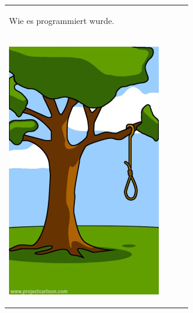 \begin{tabularx}{\textwidth}{XXXX}
\begin{minipage}[t]{0.23\textwidth}
\begin{center}
Wie es programmiert wurde.
\end{center}
\end{minipage}
\\
\begin{minipage}[t]{0.23\textwidth}
\begin{center}
\includegraphics[width=1.0\textwidth]{./inf/SEKII/29_Softwaretechnik/PM_05.jpg}


\end{center}
\end{minipage}
\end{tabularx}
